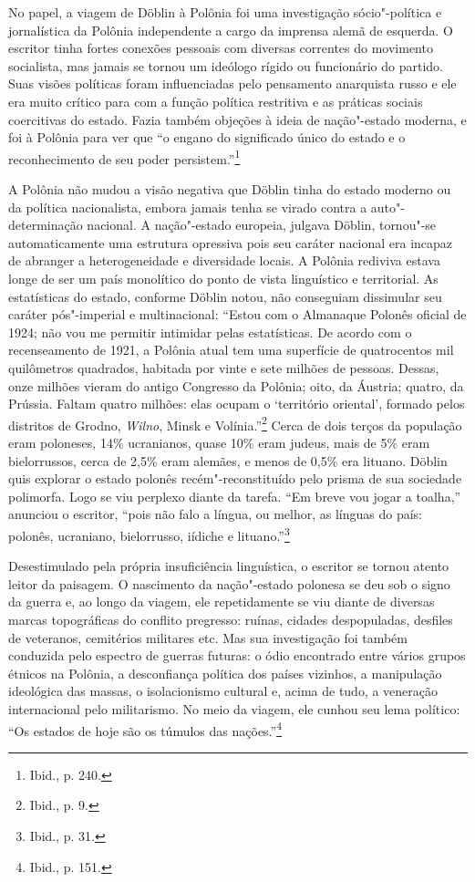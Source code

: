 \asterisc

No papel, a viagem de Döblin à Polônia foi uma investigação
sócio"-política e jornalística da Polônia independente a cargo da
imprensa alemã de esquerda. O escritor tinha fortes conexões pessoais
com diversas correntes do movimento socialista, mas jamais se tornou um
ideólogo rígido ou funcionário do partido. Suas visões políticas foram
influenciadas pelo pensamento anarquista russo e ele era muito crítico
para com a função política restritiva e as práticas sociais coercitivas
do estado. Fazia também objeções à ideia de nação"-estado moderna, e foi
à Polônia para ver que ``o engano do significado único do estado e o
reconhecimento de seu poder persistem.''\footnote{Ibid., p. 240.}

A Polônia não mudou a visão negativa que Döblin tinha do estado moderno
ou da política nacionalista, embora jamais tenha se virado contra a
auto"-determinação nacional. A nação"-estado europeia, julgava Döblin,
tornou"-se automaticamente uma estrutura opressiva pois seu caráter
nacional era incapaz de abranger a heterogeneidade e diversidade locais.
A Polônia rediviva estava longe de ser um país monolítico do ponto de
vista linguístico e territorial. As estatísticas do estado, conforme
Döblin notou, não conseguiam dissimular seu caráter pós"-imperial e
multinacional: ``Estou com o Almanaque Polonês oficial de 1924; não vou
me permitir intimidar pelas estatísticas. De acordo com o recenseamento
de 1921, a Polônia atual tem uma superfície de quatrocentos mil
quilômetros quadrados, habitada por vinte e sete milhões de pessoas.
Dessas, onze milhões vieram do antigo Congresso da Polônia; oito, da
Áustria; quatro, da Prússia. Faltam quatro milhões: elas ocupam o
`território oriental', formado pelos distritos de Grodno, \textit{Wilno}, Minsk e
Volínia.''\footnote{Ibid., p. 9.} Cerca de dois terços da população eram
poloneses, 14\% ucranianos, quase 10\% eram
judeus, mais de 5\% eram bielorrussos, cerca de 2,5\% eram alemães, 
e menos de 0,5\% era lituano. Döblin
quis explorar o estado polonês recém"-reconstituído pelo prisma de sua
sociedade polimorfa. Logo se viu perplexo diante da tarefa. ``Em breve
vou jogar a toalha,'' anunciou o escritor, ``pois não falo a língua, ou
melhor, as línguas do país: polonês, ucraniano, bielorrusso, iídiche e
lituano.''\footnote{Ibid., p. 31.}

Desestimulado pela própria insuficiência linguística, o escritor se
tornou atento leitor da paisagem. O nascimento da nação"-estado polonesa
se deu sob o signo da guerra e, ao longo da viagem, ele repetidamente se
viu diante de diversas marcas topográficas do conflito pregresso:
ruínas, cidades despopuladas, desfiles de veteranos, cemitérios
militares etc. Mas sua investigação foi também conduzida pelo espectro
de guerras futuras: o ódio encontrado entre vários grupos étnicos na
Polônia, a desconfiança política dos países vizinhos, a manipulação
ideológica das massas, o isolacionismo cultural e, acima de tudo, a
veneração internacional pelo militarismo. No meio da viagem, ele cunhou
seu lema político: ``Os estados de hoje são os túmulos das
nações.''\footnote{Ibid., p. 151.}

